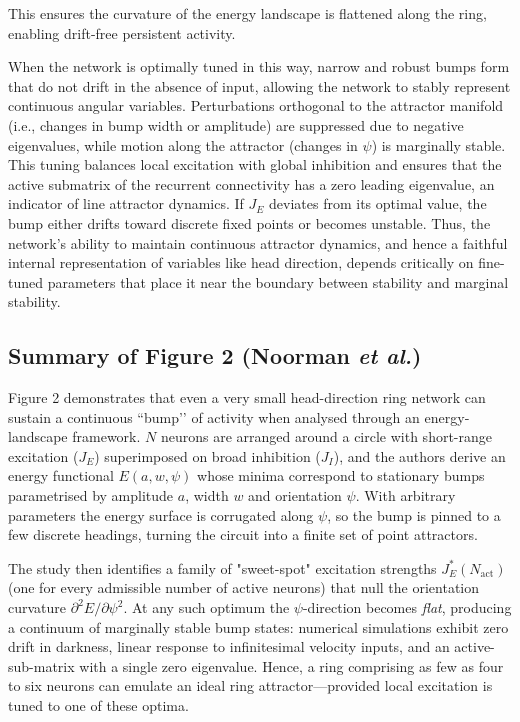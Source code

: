 \documentclass[11pt,a4paper]{article}
\begin{document}
This ensures the curvature of the energy landscape is flattened along the ring, enabling drift-free persistent activity.

When the network is optimally tuned in this way, narrow and robust bumps form that do not drift in the absence of input, allowing the network to stably represent continuous angular variables. Perturbations orthogonal to the attractor manifold (i.e., changes in bump width or amplitude) are suppressed due to negative eigenvalues, while motion along the attractor (changes in \( \psi \)) is marginally stable. This tuning balances local excitation with global inhibition and ensures that the active submatrix of the recurrent connectivity has a zero leading eigenvalue, an indicator of line attractor dynamics. If \( J_E \) deviates from its optimal value, the bump either drifts toward discrete fixed points or becomes unstable. Thus, the network’s ability to maintain continuous attractor dynamics, and hence a faithful internal representation of variables like head direction, depends critically on fine-tuned parameters that place it near the boundary between stability and marginal stability.


\subsection{Summary of Figure 2 (Noorman \emph{et al.})}

Figure 2 demonstrates that even a very small head-direction ring network can sustain a continuous “bump’’ of activity when analysed through an energy‐landscape framework.  \(N\) neurons are arranged around a circle with short-range excitation (\(J_E\)) superimposed on broad inhibition (\(J_I\)), and the authors derive an energy functional \(E(a,w,\psi)\) whose minima correspond to stationary bumps parametrised by amplitude \(a\), width \(w\) and orientation \(\psi\).  With arbitrary parameters the energy surface is corrugated along \(\psi\), so the bump is pinned to a few discrete headings, turning the circuit into a finite set of point attractors.

The study then identifies a family of "sweet-spot" excitation strengths \(J_E^{\!*}(N_{\text{act}})\) (one for every admissible number of active neurons) that null the orientation curvature \(\partial^{2}E/\partial\psi^{2}\).  At any such optimum the \(\psi\)-direction becomes \emph{flat}, producing a continuum of marginally stable bump states: numerical simulations exhibit zero drift in darkness, linear response to infinitesimal velocity inputs, and an active-sub-matrix with a single zero eigenvalue.  Hence, a ring comprising as few as four to six neurons can emulate an ideal ring attractor—provided local excitation is tuned to one of these optima.
\end{document}
